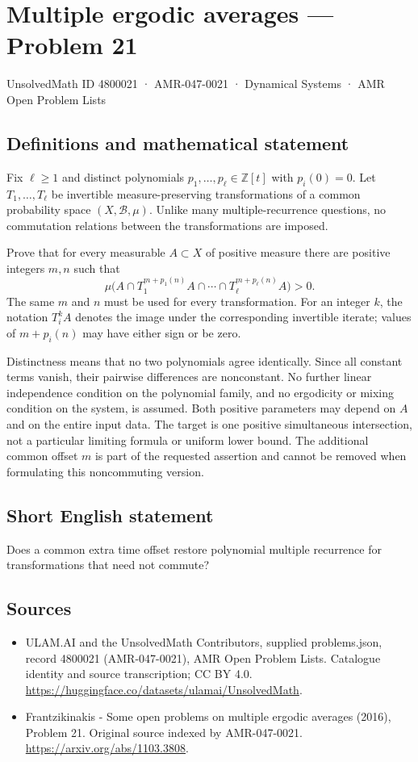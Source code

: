\documentclass[11pt,a4paper]{article}
\begin{document}
\section*{Multiple ergodic averages — Problem 21}\label{4800021}
{\small UnsolvedMath ID 4800021 · AMR-047-0021 · Dynamical Systems · AMR Open Problem Lists}
\subsection{Definitions and mathematical statement}
Fix $\ell\ge1$ and distinct polynomials
$p_1,\ldots,p_\ell\in\mathbb Z[t]$ with $p_i(0)=0$.
Let $T_1,\ldots,T_\ell$ be invertible measure-preserving
transformations of a common probability space
$(X,\mathcal B,\mu)$. Unlike many multiple-recurrence
questions, no commutation relations between the
transformations are imposed.

Prove that for every measurable $A\subset X$ of
positive measure there are positive integers $m,n$
such that
\[
          \mu\bigl(A\cap T_1^{m+p_1(n)}A\cap\cdots
                             \cap T_\ell^{m+p_\ell(n)}A\bigr)>0.
\]
The same $m$ and $n$ must be used for every
transformation. For an integer $k$, the notation
$T_i^kA$ denotes the image under the corresponding
invertible iterate; values of $m+p_i(n)$ may have
either sign or be zero.

Distinctness means that no two polynomials agree
identically. Since all constant terms vanish, their
pairwise differences are nonconstant. No further
linear independence condition on the polynomial
family, and no ergodicity or mixing condition on
the system, is assumed. Both positive parameters
may depend on $A$ and on the entire input data.
The target is one positive simultaneous intersection,
not a particular limiting formula or uniform lower
bound. The additional common offset $m$ is part
of the requested assertion and cannot be removed
when formulating this noncommuting version.
\subsection{Short English statement}
Does a common extra time offset restore polynomial multiple recurrence for transformations that need not commute?
\subsection{Sources}
\begin{itemize}
\item[S1] ULAM.AI and the UnsolvedMath Contributors, supplied problems.json, record 4800021 (AMR-047-0021), AMR Open Problem Lists. Catalogue identity and source transcription; CC BY 4.0.
\url{https://huggingface.co/datasets/ulamai/UnsolvedMath}.
\item[S2] Frantzikinakis - Some open problems on multiple ergodic averages (2016), Problem 21. Original source indexed by AMR-047-0021.
\url{https://arxiv.org/abs/1103.3808}.
\end{itemize}
\end{document}
